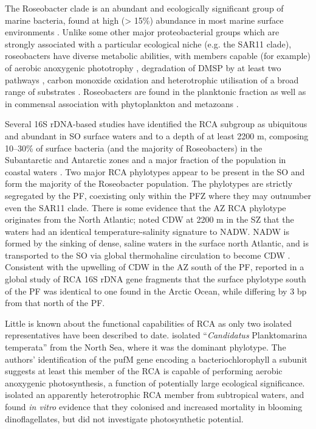 
The Roseobacter clade is an abundant and ecologically significant group of marine bacteria, found at high (> 15\%) abundance in most marine surface environments \citep[][and references therein]{Buchan:2005hd}.
Unlike some other major proteobacterial groups which are strongly associated with a particular ecological niche (e.g. the SAR11 clade), roseobacters have diverse metabolic abilities, with members capable (for example) of aerobic anoxygenic phototrophy \cite{Biebl:2005fp,Beja:2002gt}, degradation of \ac{DMSP} by at least two pathways \cite{Miller:2004jz,Moran:2003cwa}, carbon monoxide oxidation \cite{King:2003kc} and heterotrophic utilisation of a broad range of substrates \citep[reviewed in][]{Brinkhoff:2008do}.
Roseobacters are found in the planktonic fraction as well as in commensal association with phytoplankton and metazoans \citep[reiviewed in][]{Buchan:2005hd}.

Several 16S rDNA-based studies have identified the \ac{RCA} subgroup as ubiquitous and abundant in \ac{SO} surface waters and to a depth of at least 2200 m, composing \textapprox{} 10--30\% of surface bacteria (and the majority of Roseobacters) in the Subantarctic and Antarctic zones \cite{Giebel:2009hr,Murray:2007db,Ghiglione:2011ee} and a major fraction of the population in coastal waters \cite{Murray:2007db,Koh:2011ij}.
Two major \ac{RCA} phylotypes appear to be present in the \ac{SO} and form the majority of the Roseobacter population.
The phylotypes are strictly segregated by the \ac{PF}, coexisting only within the \ac{PFZ} \cite{Selje:2004ka,Giebel:2009hr} where they may outnumber even the SAR11 clade.
There is some evidence that the \ac{AZ} \ac{RCA} phylotype originates from the North Atlantic; \citet{Giebel:2009hr} noted \ac{CDW} at 2200 m in the \ac{SZ} that the waters had an identical temperature-salinity signature to \ac{NADW}.
\ac{NADW} is formed by the sinking of dense, saline waters in the surface north Atlantic, and is transported to the \ac{SO} via global thermohaline circulation to become \ac{CDW} \cite{Callahan:1972tk}.
Consistent with the upwelling of \ac{CDW} in the \ac{AZ} south of the \ac{PF}, \citep{Selje:2004ka} reported in a global study of \ac{RCA} 16S rDNA gene fragments that the surface phylotype south of the \ac{PF} was identical to one found in the Arctic Ocean, while differing by 3 bp from that north of the \ac{PF}.

Little is known about the functional capabilities of \ac{RCA} as only two isolated representatives have been described to date.
\citep{Giebel:2010bsa} isolated ``\emph{Candidatus} Planktomarina temperata'' from the North Sea, where it was the dominant phylotype.
The authors' identification of the pufM gene encoding a bacteriochlorophyll a subunit suggests at least this member of the \ac{RCA} is capable of performing aerobic anoxygenic photosynthesis, a function of potentially large ecological significance.
\citep{Mayali:2008eb} isolated an apparently heterotrophic \ac{RCA} member from subtropical waters, and found \emph{in vitro} evidence that they colonised and increased mortality in blooming dinoflagellates, but did not investigate photosynthetic potential.

